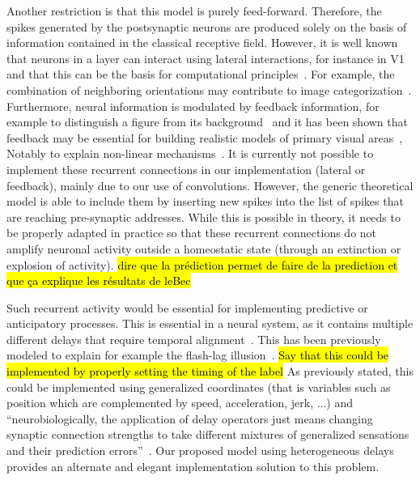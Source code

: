 \documentclass[default]{sn-jnl}%
\theoremstyle{thmstyleone}%
\theoremstyle{thmstyletwo}%
\theoremstyle{thmstylethree}%
\newcommand{\note}[1]{{\sethlcolor{yellow}\hl{#1}}}
\begin{document}
Another restriction is that this model is purely feed-forward. Therefore, the spikes generated by the postsynaptic neurons are produced solely on the basis of information contained in the classical receptive field. However, it is well known that neurons in a layer can interact using lateral interactions, for instance in V1 and that this can be the basis for computational principles~\citep{chavane_revisiting_2022}. For example, the combination of neighboring orientations may contribute to image categorization~\citep{perrinet_edge_2015}. Furthermore, neural information is modulated by feedback information, for example to distinguish a figure from its background~\citep{roelfsema_early_2016} and it has been shown that feedback may be essential for building realistic models of primary visual areas~\citep{boutin_sparse_2020, boutin_effect_2020}, Notably to explain non-linear mechanisms~\citep{boutin_pooling_2022}. It is currently not possible to implement these recurrent connections in our implementation (lateral or feedback), mainly due to our use of convolutions. However, the generic theoretical model is able to include them by inserting new spikes into the list of spikes that are reaching pre-synaptic addresses. While this is possible in theory, it needs to be properly adapted in practice so that these recurrent connections do not amplify neuronal activity outside a homeostatic state (through an extinction or explosion of activity).  
\note{ dire que la prédiction permet de faire de la prediction et que ça explique les résultats de leBec}%


Such recurrent activity would be essential for implementing predictive or anticipatory processes. This is essential in a neural system, as it contains multiple different delays that require temporal alignment~\citep{hogendoorn_predictive_2019}. This has been previously modeled to explain for example the flash-lag illusion~\citep{khoei_flash-lag_2017}. \note{Say that this could be implemented by properly setting the timing of the label} As previously stated, this could be implemented using generalized coordinates (that is variables such as position which are complemented by speed, acceleration, jerk, ...) and ``neurobiologically, the application of delay operators just means changing synaptic connection strengths to take different mixtures of generalized sensations and their prediction errors''~\citep{perrinet_active_2014}. Our proposed model using heterogeneous delays provides an alternate and elegant implementation solution to this problem.
%
\end{document}
